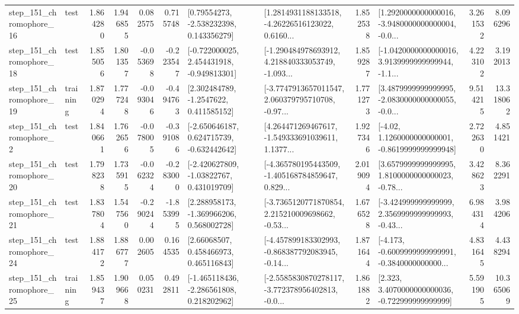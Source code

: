 \begin{tabular}{llrrrrllrlrr}
  step\_151\_chromophore\_16 &      test &      1.864280 &    1.946855 &      0.082575 &  0.715748 &     [0.79554273, -2.538232398, 0.143356279] &  [1.2814931188133518, -4.26226516123022, 0.6160... &       1.852538 &  [1.2920000000000016, -3.9480000000000004, -0.0... &            3.261532 &          8.096296 \\
  step\_151\_chromophore\_18 &      test &      1.855056 &    1.801357 &     -0.053698 & -0.223547 &   [-0.722000025, 2.454431918, -0.949813301] &  [-1.290484978693912, 4.218840333053749, -1.093... &       1.859287 &  [-1.0420000000000016, 3.9139999999999944, -1.1... &            4.223102 &          3.192013 \\
  step\_151\_chromophore\_19 &  training &      1.870294 &    1.777248 &     -0.093046 & -0.494763 &      [2.302484789, -1.2547622, 0.411585152] &  [-3.7747913657011547, 2.060379795710708, -0.97... &       1.771273 &  [3.4879999999999995, -2.0830000000000055, -0.0... &            9.514215 &         13.318062 \\
   step\_151\_chromophore\_2 &      test &      1.840661 &    1.762656 &     -0.078005 & -0.391086 &   [-2.650646187, 0.624715739, -0.632442642] &  [4.264471269467617, -1.549333691039611, 1.1377... &       1.927346 &   [-4.02, 1.1260000000000001, -0.8619999999999948] &            2.722630 &          4.851421 \\
  step\_151\_chromophore\_20 &      test &      1.798238 &    1.735915 &     -0.062324 & -0.283000 &    [-2.420627809, -1.03822767, 0.431019709] &  [-4.365780195443509, -1.405168784859647, 0.829... &       2.019094 &  [3.6579999999999995, 1.8100000000000023, -0.78... &            3.428623 &          8.362291 \\
  step\_151\_chromophore\_21 &      test &      1.837804 &    1.547560 &     -0.290244 & -1.853995 &    [2.288958173, -1.369966206, 0.568002728] &  [-3.7365120771870854, 2.215210009698662, -0.53... &       1.676528 &  [-3.424999999999999, 2.3569999999999993, -0.43... &            6.984314 &          3.984206 \\
  step\_151\_chromophore\_24 &      test &      1.884172 &    1.886777 &      0.002605 &  0.164535 &      [2.66068507, 0.458466973, 0.465116843] &  [-4.457899183302993, -0.868387792083945, -0.14... &       1.871644 &  [-4.173, -0.6009999999999991, -0.3840000000000... &            4.831645 &          4.438294 \\
  step\_151\_chromophore\_25 &  training &      1.859437 &    1.909668 &      0.050231 &  0.492811 &   [-1.465118436, -2.286561808, 0.218202962] &  [-2.5585830870278117, -3.772378956402813, -0.0... &       1.861882 &    [2.323, 3.4070000000000036, -0.722999999999999] &            5.591905 &         10.365069 \\

\end{tabular}

